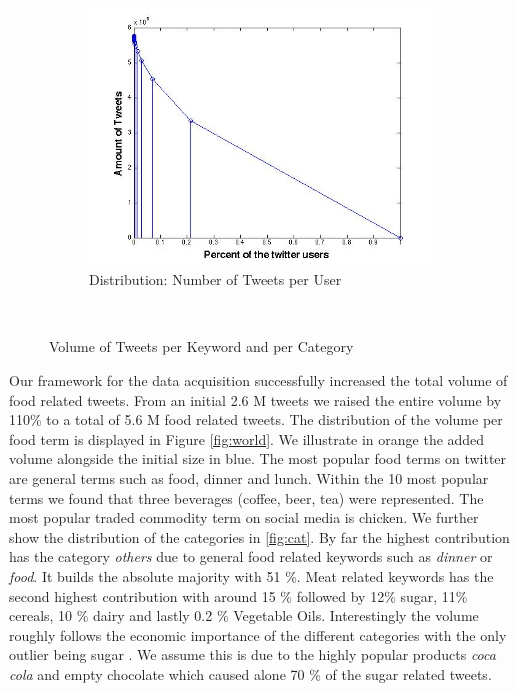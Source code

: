 \begin{figure}[ht]
\begin{subfigure}[b]{0.5\textwidth}
                \label{fig:u_log}
        \end{subfigure}
        ~ %
      \begin{subfigure}[b]{0.5\textwidth}
                \includegraphics[width=\textwidth]{img/anal/no_power}
                \caption{Distribution: Number of Tweets per User}
                \label{fig:no_power}
        \end{subfigure}
        ~ %

      
        \caption{Volume of Tweets per Keyword and per Category}\label{fig:distribution}
\end{figure}



Our framework for the data acquisition successfully increased the total volume of food related tweets. From an initial 2.6 M tweets we raised the entire volume by 110\% to a total of 5.6 M food related tweets. The distribution of the volume per food term is displayed in Figure \ref{fig:world}. We illustrate in orange the added volume alongside the initial size in blue. The most popular food terms on twitter are general terms such as food, dinner and lunch. Within the 10 most popular terms we found that three beverages (coffee, beer, tea) were represented. The most popular traded commodity term on social media is chicken.  We further show the distribution of the categories in \ref{fig:cat}. By far the highest contribution has the category \emph{others} due to general food related keywords such as \emph{dinner} or \emph{food}. It builds the absolute majority with 51 \%. Meat related keywords has the second highest contribution with around 15 \% followed by 12\% sugar, 11\%  cereals, 10 \% dairy  and lastly 0.2 \% Vegetable Oils. Interestingly the volume roughly follows the economic importance of the different categories with the only outlier being sugar \cite{fao2008}. We assume this is due to the highly popular products \emph{coca cola} and empty	{chocolate} which caused alone 70 \% of the sugar related tweets. 



